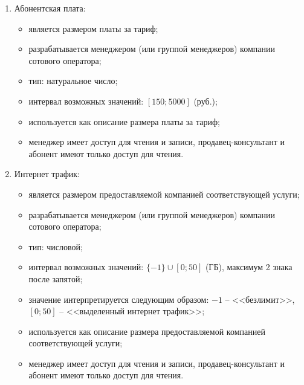 \begin{enumerate}
\begin{enumerate}
        \item Абонентская плата:
        \begin{itemize}
            \item является размером платы за тариф;
            \item разрабатывается менеджером (или группой менеджеров) компании сотового оператора;
            \item тип: натуральное число;
            \item интервал возможных значений: $[150; 5000]$ (руб.); %
            \item используется как описание размера платы за тариф;
            \item менеджер имеет доступ для чтения и записи, продавец-консультант и абонент имеют только доступ для чтения.
        \end{itemize}

        \item Интернет трафик:
        \begin{itemize}
            \item является размером предоставляемой компанией соответствующей услуги;
            \item разрабатывается менеджером (или группой менеджеров) компании сотового оператора;
            \item тип: числовой;
            \item интервал возможных значений: $\{-1\} \cup [0; 50]$ (ГБ), максимум 2 знака после запятой; %
            \item значение интерпретируется следующим образом: $-1$ -- <<безлимит>>, $[0; 50]$ -- <<выделенный интернет трафик>>;
            \item используется как описание размера предоставляемой компанией соответствующей услуги;
            \item менеджер имеет доступ для чтения и записи, продавец-консультант и абонент имеют только доступ для чтения.
        \end{itemize}


\end{enumerate}
\end{enumerate}
